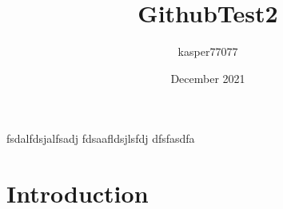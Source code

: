 \documentclass{article}
\title{GithubTest2}
\author{kasper77077 }
\date{December 2021}
\begin{document}
fsdalfdsjalfsadj
fdsaafldsjlsfdj 
dfsfasdfa
\maketitle

\section{Introduction}
\end{document}
